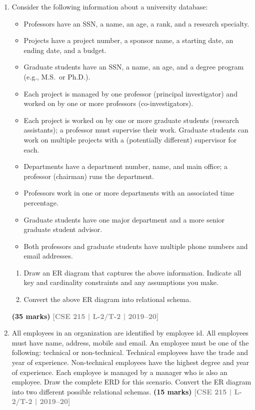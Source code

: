 \documentclass[12pt]{article}
\newcommand{\yr}[1]{\hfill\textcolor{gray}{\small\textbf{[#1]}}}
\newcommand{\mk}[1]{\textcolor{orange!70!black}{\small\textbf{(#1 marks)}}}
\begin{document}
\begin{enumerate}
\item Consider the following information about a university database:
\begin{itemize}[leftmargin=1.5em,itemsep=1pt]
  \item Professors have an SSN, a name, an age, a rank, and a research specialty.
  \item Projects have a project number, a sponsor name, a starting date, an ending date, and a budget.
  \item Graduate students have an SSN, a name, an age, and a degree program (e.g., M.S.\ or Ph.D.).
  \item Each project is managed by one professor (principal investigator) and worked on by one or more professors (co-investigators).
  \item Each project is worked on by one or more graduate students (research assistants); a professor must supervise their work. Graduate students can work on multiple projects with a (potentially different) supervisor for each.
  \item Departments have a department number, name, and main office; a professor (chairman) runs the department.
  \item Professors work in one or more departments with an associated time percentage.
  \item Graduate students have one major department and a more senior graduate student advisor.
  \item Both professors and graduate students have multiple phone numbers and email addresses.
\end{itemize}
\begin{enumerate}
  \item Draw an ER diagram that captures the above information. Indicate all key and cardinality constraints and any assumptions you make.
  \item Convert the above ER diagram into relational schema.
\end{enumerate}
\mk{35} \yr{CSE 215 | L-2/T-2 | 2019--20}


\item All employees in an organization are identified by employee id. All employees must have name, address, mobile and email. An employee must be one of the following: technical or non-technical. Technical employees have the trade and year of experience. Non-technical employees have the highest degree and year of experience. Each employee is managed by a manager who is also an employee. Draw the complete ERD for this scenario. Convert the ER diagram into two different possible relational schemas.
\mk{15} \yr{CSE 215 | L-2/T-2 | 2019--20}



\end{enumerate}
\end{document}
